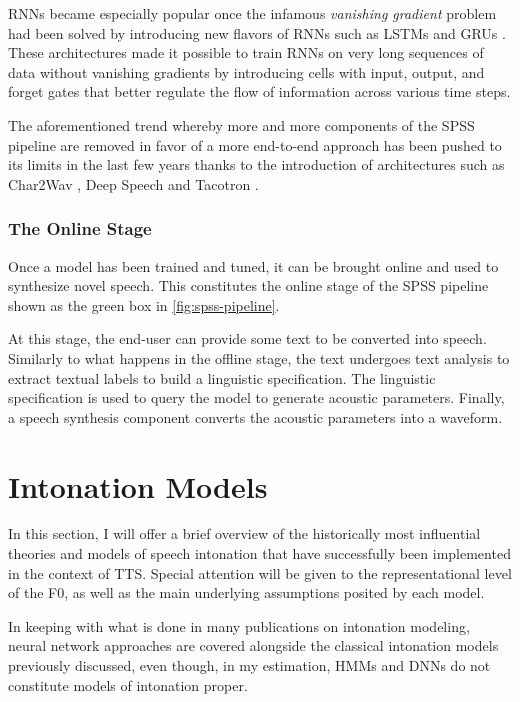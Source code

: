 \acp{RNN} became especially popular once the infamous \emph{vanishing gradient} \citep{Bengio1994Learning} problem had been solved by introducing new flavors of \acp{RNN} such as \acp{LSTM} \citep{Hochreiter1997Long} and \acp{GRU} \citep{Chung2014Empirical}.
These architectures made it possible to train \acp{RNN} on very long sequences of data without vanishing gradients by introducing cells with input, output, and forget gates that better regulate the flow of information across various time steps.

The aforementioned trend whereby more and more components of the \ac{SPSS} pipeline are removed in favor of a more end-to-end approach has been pushed to its limits in the last few years thanks to the introduction of architectures such as Char2Wav \citep{Sotelo2017Char2wav}, Deep Speech \citep{Hannun2014Deep} and Tacotron \citep{Wang2017Tacotron}.


\subsubsection{The Online Stage}

Once a model has been trained and tuned, it can be brought online and used to synthesize novel speech.
This constitutes the online stage of the \ac{SPSS} pipeline shown as the green box in \autoref{fig:spss-pipeline}.

At this stage, the end-user can provide some text to be converted into speech.
Similarly to what happens in the offline stage, the text undergoes text analysis to extract textual labels to build a linguistic specification.
The linguistic specification is used to query the model to generate acoustic parameters.
Finally, a speech synthesis component converts the acoustic parameters into a waveform.



\section{Intonation Models}\label{sec:intonation-models}

In this section, I will offer a brief overview of the historically most influential theories and models of speech intonation that have successfully been implemented in the context of \ac{TTS}.
Special attention will be given to the representational level of the \ac{F0}, as well as the main underlying assumptions posited by each model.

In keeping with what is done in many publications on intonation modeling, neural network approaches are covered alongside the classical intonation models previously discussed, even though, in my estimation, \acp{HMM} and \acp{DNN} do not constitute models of intonation proper.

